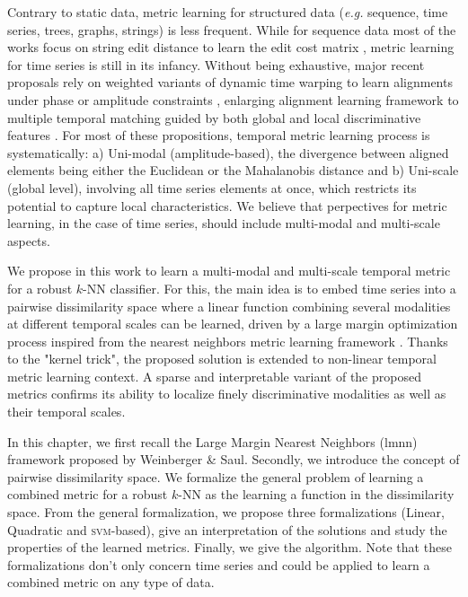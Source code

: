 Contrary to static data, metric learning for structured data (\textit{e.g.} sequence, time series, trees, graphs, strings) is less frequent. While for sequence data most of the works focus on string edit distance to learn the edit cost matrix \cite{Oncina2006,Bellet2012}, metric learning for time series is still in its infancy. Without being exhaustive, major recent proposals rely on weighted variants of dynamic time warping to learn alignments under phase or amplitude constraints \cite{Reyes2011,Jeong2011,ZhangX.-L.Z.-G.Luo2014}, enlarging alignment learning framework to multiple temporal matching guided by both global and local discriminative features \cite{Frambourg2013a}. For most of these propositions, temporal metric learning process is systematically: a) Uni-modal (amplitude-based), the divergence between aligned elements being either the Euclidean or the Mahalanobis distance and b) Uni-scale (global level), involving all time series elements at once, which restricts its potential to capture local characteristics. We believe that perpectives for metric learning, in the case of time series, should include multi-modal and multi-scale aspects.

We propose in this work to learn a multi-modal and multi-scale temporal metric for a robust $k$-NN classifier. For this, the main idea is to embed time series into a pairwise dissimilarity space where a linear function combining several modalities at different temporal scales can be learned, driven by a large margin optimization process inspired from the nearest neighbors metric learning framework \cite{Weinberger2009}. Thanks to the "kernel trick", the proposed solution is extended to non-linear temporal metric learning context. A sparse and interpretable variant of the proposed metrics confirms its ability to localize finely discriminative modalities as well as their temporal scales. 

In this chapter, we first recall the Large Margin Nearest Neighbors ({\sc lmnn}) framework proposed by Weinberger \& Saul. Secondly, we introduce the concept of pairwise dissimilarity space. We formalize the general problem of learning a combined metric for a robust $k$-NN as the learning a function in the dissimilarity space. From the general formalization, we propose three formalizations (Linear, Quadratic and \textsc{svm}-based), give an interpretation of the solutions and study the properties of the learned metrics. Finally, we give the algorithm. Note that these formalizations don't only concern time series and could be applied to learn a combined metric on any type of data. 


